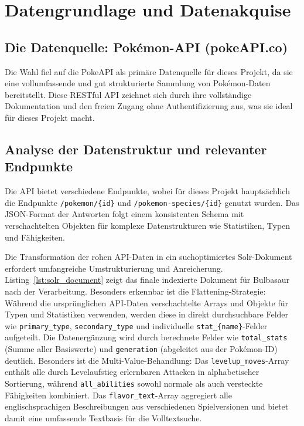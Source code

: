 \section{Datengrundlage und Datenakquise}
\label{chap:daten}

\subsection{Die Datenquelle: Pokémon-API (pokeAPI.co)}
\label{sec:datenquelle}
Die Wahl fiel auf die PokeAPI als primäre Datenquelle für dieses Projekt, da sie eine vollumfassende und gut strukturierte Sammlung von Pokémon-Daten bereitstellt. Diese RESTful API zeichnet sich durch ihre vollständige Dokumentation und den freien Zugang ohne Authentifizierung aus, was sie ideal für dieses Projekt macht.


\subsection{Analyse der Datenstruktur und relevanter Endpunkte}
\label{sec:datenstruktur}

Die API bietet verschiedene Endpunkte, wobei für dieses Projekt hauptsächlich die Endpunkte \texttt{/pokemon/\{id\}} und \texttt{/pokemon-species/\{id\}} genutzt wurden. Das JSON-Format der Antworten folgt einem konsistenten Schema mit verschachtelten Objekten für komplexe Datenstrukturen wie Statistiken, Typen und Fähigkeiten.

Die Transformation der rohen API-Daten in ein suchoptimiertes Solr-Dokument erfordert umfangreiche Umstrukturierung und Anreicherung. Listing~\ref{lst:solr_document} zeigt das finale indexierte Dokument für Bulbasaur nach der Verarbeitung. Besonders erkennbar ist die Flattening-Strategie: Während die ursprünglichen API-Daten verschachtelte Arrays und Objekte für Typen und Statistiken verwenden, werden diese in direkt durchsuchbare Felder wie \texttt{primary\_type}, \texttt{secondary\_type} und individuelle \texttt{stat\_\{name\}}-Felder aufgeteilt.
Die Datenergänzung wird durch berechnete Felder wie \texttt{total\_stats} (Summe aller Basiswerte) und \texttt{generation} (abgeleitet aus der Pokémon-ID) deutlich. Besonders ist die Multi-Value-Behandlung: Das \texttt{levelup\_moves}-Array enthält alle durch Levelaufstieg erlernbaren Attacken in alphabetischer Sortierung, während \texttt{all\_abilities} sowohl normale als auch versteckte Fähigkeiten kombiniert. Das \texttt{flavor\_text}-Array aggregiert alle englischsprachigen Beschreibungen aus verschiedenen Spielversionen und bietet damit eine umfassende Textbasis für die Volltextsuche.

